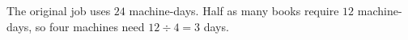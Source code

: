 The original job uses $24$ machine-days. Half as many books require $12$ machine-days, so four machines need $12\div4=\boxed3$ days.
